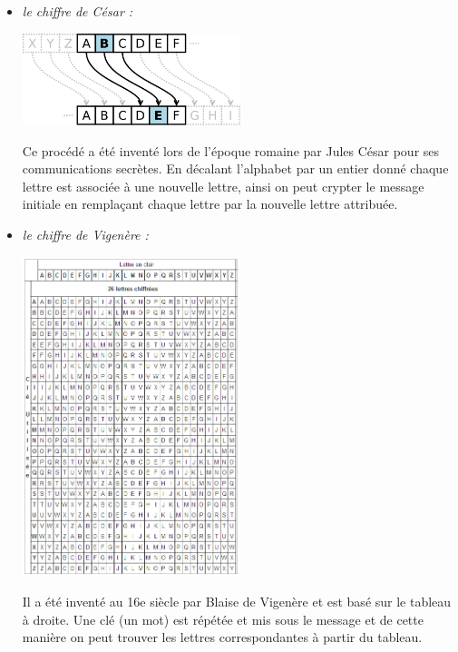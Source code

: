 \documentclass[a4paper,12pt,abstracton,titlepage]{scrartcl}
\begin{document}
\begin{itemize}
\item \textit{le chiffre de César :}
\begin{floatingfigure}[r]{8.3cm}
	\includegraphics[width=0.5\textwidth]{./Pictures/chiffreCesar.png}
	\label{cesar}
\end{floatingfigure}
Ce procédé a été inventé lors de l'époque romaine par Jules César pour ses communications secrètes. En décalant l'alphabet par un entier donné chaque lettre est associée à une nouvelle lettre, ainsi on peut crypter le message initiale en remplaçant chaque lettre par la nouvelle lettre attribuée.
\item \textit{le chiffre de Vigenère :}
\begin{floatingfigure}[r]{8.3cm}
	\includegraphics[width=0.5\textwidth]{./Pictures/tableauVigenere.png}
	\label{vigenere}
\end{floatingfigure}
Il a été inventé au 16e siècle par Blaise de Vigenère et est basé sur le tableau à droite. Une clé (un mot) est répétée et mis sous le message et de cette manière on peut trouver les lettres correspondantes à partir du tableau.\\


\end{itemize}
\end{document}
